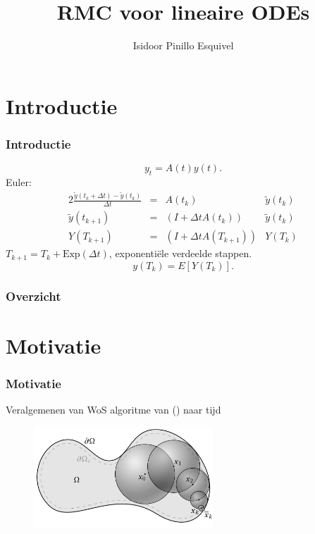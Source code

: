 \documentclass[18pt,aspectratio=149]{beamer}
\title{RMC voor lineaire ODEs}
\author{Isidoor Pinillo Esquivel }
\date{}
\begin{document}
\begin{frame}
    \titlepage
\end{frame}

\section{Introductie}
\begin{frame}
    \frametitle{Introductie}
    \begin{equation}
        y_{t} = A(t)y(t)
        .
    \end{equation}
    Euler:
    \begin{alignat}{2}
        \frac{\tilde{y}(t_{k}+\Delta t)-\tilde{y}(t_{k})}{\Delta t} & = & A(t_{k})                & \tilde{y}(t_{k}) \\
        \tilde{y}(t_{k+1})                                          & = & (I+\Delta t A(t_{k}))   & \tilde{y}(t_{k}) \\
        Y(T_{k+1})                                                  & = & (I+\Delta t A(T_{k+1})) & Y(T_{k})
    \end{alignat}
    $T_{k+1} = T_{k} + \text{Exp}(\Delta t)$, exponentiële verdeelde stappen.
    \begin{equation}
        y(T_{k})=E[Y(T_{k})].
    \end{equation}

\end{frame}

\begin{frame}
    \frametitle{Overzicht}
    \tableofcontents
\end{frame}

\section{Motivatie}
\begin{frame}
    \frametitle{Motivatie}
    Veralgemenen van WoS algoritme van (\cite{sawhney_grid-free_2022})
    naar tijd
    \vspace{-0.25cm}
    \begin{figure}[h!]
        \centering
        \includegraphics[width=0.6\textwidth]{imgs/Walk_on_Spheres_illustration.jpg}
        \label{fig:Walk_on_Spheres_illustration.jpg}
    \end{figure}
\end{frame}
\end{document}
